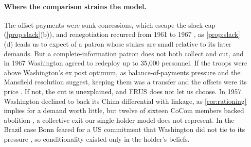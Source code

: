 \paragraph{Where the comparison strains the model.} The offset payments were sunk concessions, which escape the slack cap (\cref{prop:slack}(b)), and renegotiation recurred from 1961 to 1967 \citep{frus1995foreignecon, frus1999germany, frus1995westerneurope}, as \cref{prop:slack}(d) leads us to expect of a patron whose stakes are small relative to its later demands. But a complete-information patron does not both collect and cut, and in 1967 Washington agreed to redeploy up to 35,000 personnel. If the troops were above Washington's ex post optimum, as balance-of-payments pressure and the Mansfield resolution suggest, keeping them was a transfer and the offsets were its price \citep{gavin2004gold, zimmermann2002money}. If not, the cut is unexplained, and FRUS does not let us choose. In 1957 Washington declined to back its China differential with linkage, as \cref{cor:rationing} implies for a demand worth little, but twelve of sixteen CoCom members backed abolition \citep{frus1989economicdefense, mastanduno1992economic}, a collective exit our single-holder model does not represent. In the Brazil case Bonn feared for a US commitment that Washington did not tie to its pressure \citep{frus2014westerneurope}, so conditionality existed only in the holder's beliefs.
